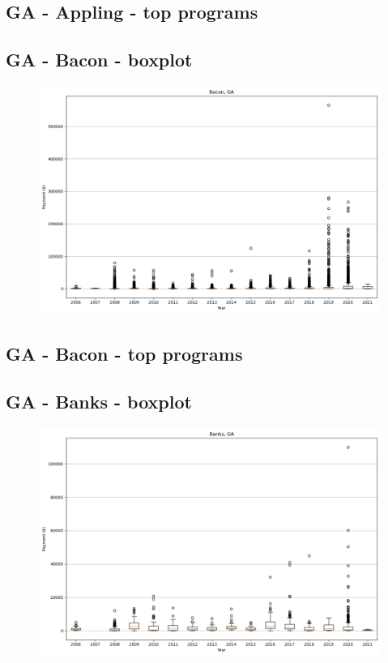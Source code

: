 \subsection*{GA - Appling - top programs}

\newpage
\subsection*{GA - Bacon - boxplot}
\begin{figure}[h]
\centering
\includegraphics[width=7in]{../output/boxplots/counties/Bacon-GA_boxplot.png}
\end{figure}


\subsection*{GA - Bacon - top programs}

\newpage
\subsection*{GA - Banks - boxplot}
\begin{figure}[h]
\centering
\includegraphics[width=7in]{../output/boxplots/counties/Banks-GA_boxplot.png}
\end{figure}



